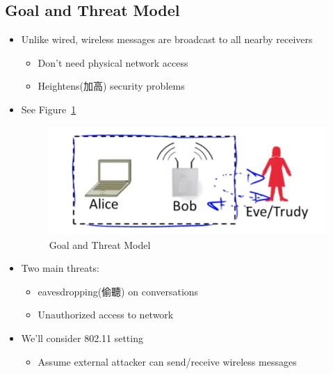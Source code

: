 \documentclass[12pt]{ctexart}   %
\begin{document}
	\subsection{Goal and Threat Model}
	\begin{itemize}
		\item Unlike wired, wireless messages are broadcast to all nearby receivers
		\begin{itemize}
			\item Don't need physical network access
			\item Heightens(加高) security problems
		\end{itemize}
		\item See Figure~\ref{fig:10-4-2}
		  
		\begin{figure}[h!] %
		\centering
		\includegraphics[scale=0.7]{images/10-4-2}
		\caption{Goal and Threat Model}
		\label{fig:10-4-2}
		\end{figure}

		\item Two main threats:
		\begin{itemize}
			\item eavesdropping(偷聽) on conversations
			\item Unauthorized access to network
		\end{itemize}

		\item We'll consider 802.11 setting
		\begin{itemize}
			\item Assume external attacker can send/receive wireless messages
		\end{itemize}
	\end{itemize}
\end{document}
